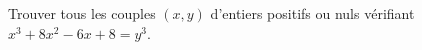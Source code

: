 Trouver tous les couples $(x, y)$ d'entiers positifs ou nuls vérifiant $x^3 + 8x^2 - 6x + 8 = y^3$.
